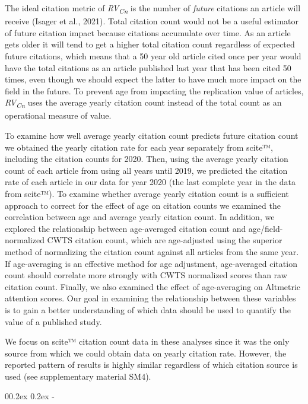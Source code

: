 \documentclass[
  man,floatsintext]{apa6}
\makeatletter
\let\oldsubparagraph\subparagraph
\renewcommand{\subparagraph}[1]{\oldsubparagraph{#1}\mbox{}}
\renewcommand{\subparagraph}[1]{\@startsection{subparagraph}{5}{1em}%
  {0\baselineskip \@plus 0.2ex \@minus 0.2ex}%
  {-\z@\relax}%
  {\normalfont\normalsize\itshape\hspace{\parindent}{#1}\textit{\addperi}}{\relax}}
\makeatother
\begin{document}
The ideal citation metric of \emph{RV\textsubscript{Cn}} is the number of \emph{future} citations an article will receive (Isager et al., 2021). Total citation count would not be a useful estimator of future citation impact because citations accumulate over time. As an article gets older it will tend to get a higher total citation count regardless of expected future citations, which means that a 50 year old article cited once per year would have the total citations as an article published last year that has been cited 50 times, even though we should expect the latter to have much more impact on the field in the future. To prevent age from impacting the replication value of articles, \emph{RV\textsubscript{Cn}} uses the average yearly citation count instead of the total count as an operational measure of value.

To examine how well average yearly citation count predicts future citation count we obtained the yearly citation rate for each year separately from scite™, including the citation counts for 2020. Then, using the average yearly citation count of each article from using all years until 2019, we predicted the citation rate of each article in our data for year 2020 (the last complete year in the data from scite™). To examine whether average yearly citation count is a sufficient approach to correct for the effect of age on citation counts we examined the correlation between age and average yearly citation count. In addition, we explored the relationship between age-averaged citation count and age/field-normalized CWTS citation count, which are age-adjusted using the superior method of normalizing the citation count against all articles from the same year. If age-averaging is an effective method for age adjustment, age-averaged citation count should correlate more strongly with CWTS normalized scores than raw citation count. Finally, we also examined the effect of age-averaging on Altmetric attention scores. Our goal in examining the relationship between these variables is to gain a better understanding of which data should be used to quantify the value of a published study.

We focus on scite™ citation count data in these analyses since it was the only source from which we could obtain data on yearly citation rate. However, the reported pattern of results is highly similar regardless of which citation source is used (see supplementary material SM4).

\hypertarget{predictive-accuracy}{%
\subparagraph{Predictive accuracy}\label{predictive-accuracy}}
\end{document}
